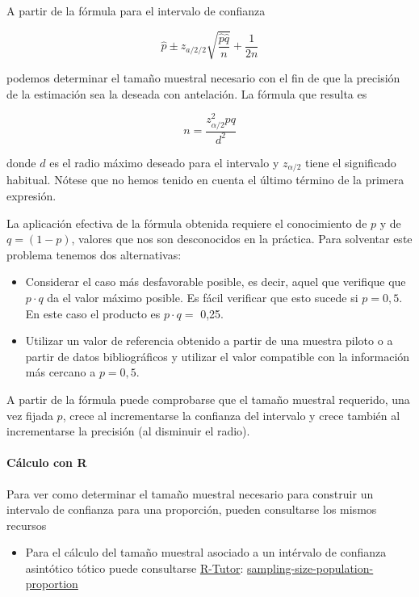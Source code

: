 \documentclass[
]{article}
\providecommand{\tightlist}{%
  \setlength{\itemsep}{0pt}\setlength{\parskip}{0pt}}
\begin{document}
A partir de la fórmula para el intervalo de confianza

\[
\hat{p} \pm z_{a / 2 / 2} \sqrt{\frac{\hat{p} \hat{q}}{n}}+\frac{1}{2 n}
\]

podemos determinar el tamaño muestral necesario con el fin de que la precisión de la estimación sea la deseada con antelación. La fórmula que resulta es

\[
n=\frac{z_{\alpha / 2}^{2} p q}{d^{2}}
\]

donde \(d\) es el radio máximo deseado para el intervalo y \(z_{\alpha / 2}\) tiene el significado habitual. Nótese que no hemos tenido en cuenta el último término de la primera expresión.

La aplicación efectiva de la fórmula obtenida requiere el conocimiento de \(p\) y de \(q=(1-p)\), valores que nos son desconocidos en la práctica. Para solventar este problema tenemos dos alternativas:

\begin{itemize}
\tightlist
\item
  Considerar el caso más desfavorable posible, es decir, aquel que verifique que \(p \cdot q\) da el valor máximo posible. Es fácil verificar que esto sucede si \(p=0,5\). En este caso el producto es \(p \cdot q=\) 0,25.
\item
  Utilizar un valor de referencia obtenido a partir de una muestra piloto o a partir de datos bibliográficos y utilizar el valor compatible con la información más cercano a \(p=0,5\).
\end{itemize}

A partir de la fórmula puede comprobarse que el tamaño muestral requerido, una vez fijada \(p\), crece al incrementarse la confianza del intervalo y crece también al incrementarse la precisión (al disminuir el radio).

\paragraph{Cálculo con R}\label{cuxe1lculo-con-r-2}

Para ver como determinar el tamaño muestral necesario para construir un intervalo de confianza para una proporción, pueden consultarse los mismos recursos

\begin{itemize}
\tightlist
\item
  Para el cálculo del tamaño muestral asociado a un intérvalo de confianza asintótico tótico puede consultarse \href{r-tutor.com}{R-Tutor}: \href{https://www.r-tutor.com/elementary-statistics/interval-estimation/sampling-size-population-proportion}{sampling-size-population-proportion}
\end{itemize}
\end{document}

